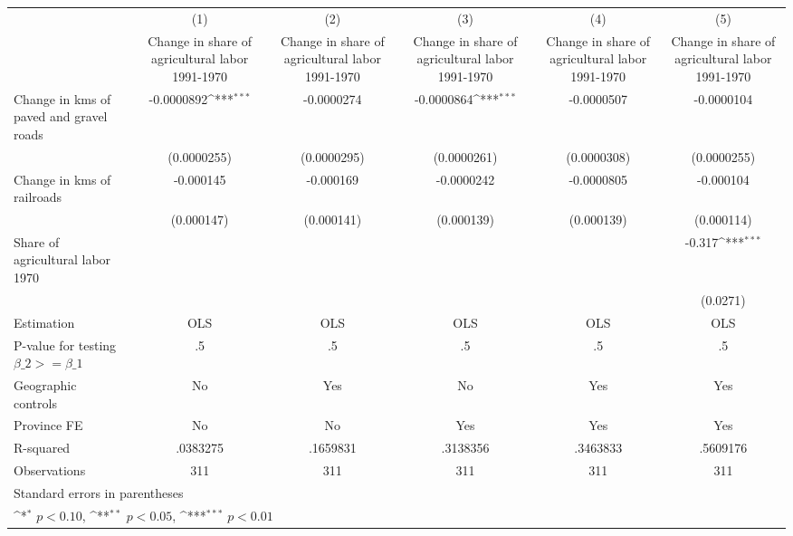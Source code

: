 {
\def\sym#1{\ifmmode^{#1}\else\(^{#1}\)\fi}
\begin{tabular}{l*{5}{c}}
\hline\hline
                    &\multicolumn{1}{c}{(1)}&\multicolumn{1}{c}{(2)}&\multicolumn{1}{c}{(3)}&\multicolumn{1}{c}{(4)}&\multicolumn{1}{c}{(5)}\\
                    &\multicolumn{1}{c}{Change in share of agricultural labor 1991-1970}&\multicolumn{1}{c}{Change in share of agricultural labor 1991-1970}&\multicolumn{1}{c}{Change in share of agricultural labor 1991-1970}&\multicolumn{1}{c}{Change in share of agricultural labor 1991-1970}&\multicolumn{1}{c}{Change in share of agricultural labor 1991-1970}\\
\hline
Change in kms of paved and gravel roads&  -0.0000892\sym{***}&  -0.0000274         &  -0.0000864\sym{***}&  -0.0000507         &  -0.0000104         \\
                    & (0.0000255)         & (0.0000295)         & (0.0000261)         & (0.0000308)         & (0.0000255)         \\
[1em]
Change in kms of railroads&   -0.000145         &   -0.000169         &  -0.0000242         &  -0.0000805         &   -0.000104         \\
                    &  (0.000147)         &  (0.000141)         &  (0.000139)         &  (0.000139)         &  (0.000114)         \\
[1em]
Share of agricultural labor 1970&                     &                     &                     &                     &      -0.317\sym{***}\\
                    &                     &                     &                     &                     &    (0.0271)         \\
\hline
Estimation          &         OLS         &         OLS         &         OLS         &         OLS         &         OLS         \\
P-value for testing $\beta\_2 >= \beta\_1$&          .5         &          .5         &          .5         &          .5         &          .5         \\
Geographic controls &          No         &         Yes         &          No         &         Yes         &         Yes         \\
Province FE         &          No         &          No         &         Yes         &         Yes         &         Yes         \\
R-squared           &    .0383275         &    .1659831         &    .3138356         &    .3463833         &    .5609176         \\
Observations        &         311         &         311         &         311         &         311         &         311         \\
\hline\hline
\multicolumn{6}{l}{\footnotesize Standard errors in parentheses}\\
\multicolumn{6}{l}{\footnotesize \sym{*} \(p<0.10\), \sym{**} \(p<0.05\), \sym{***} \(p<0.01\)}\\
\end{tabular}
}
